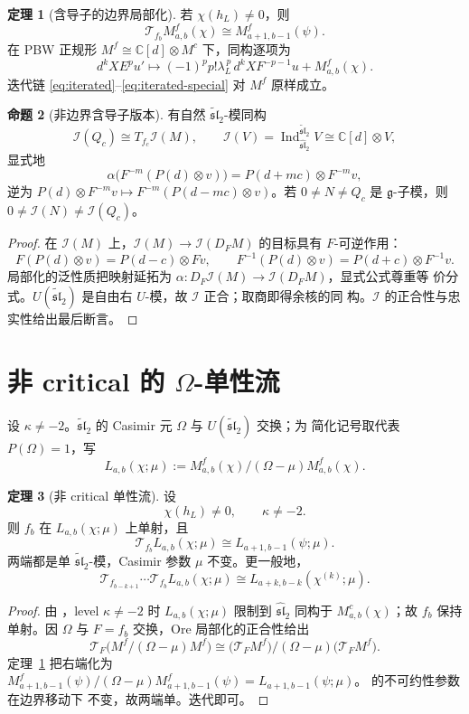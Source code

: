 \documentclass[UTF8,11pt]{ctexart}
\newcommand{\C}{\mathbb C}
\newcommand{\g}{\mathfrak g}
\newcommand{\slh}{\widehat{\mathfrak{sl}}_2}
\newcommand{\slt}{\widetilde{\mathfrak{sl}}_2}
\newcommand{\Ind}{\operatorname{Ind}}
\newcommand{\I}{\mathcal I}
\newcommand{\T}{\mathcal T}
\theoremstyle{definition}
\newtheorem{proposition}{命题}[section]
\newtheorem{theorem}[proposition]{定理}
\begin{document}
\begin{theorem}[含导子的边界局部化]\label{thm:boundary-f}
若 \(\chi(h_L)\ne0\)，则
\[
\boxed{\ \T_{f_b}M^f_{a,b}(\chi)\cong M^f_{a+1,b-1}(\psi).\ }
\]
在 PBW 正规形 \(M^f\cong\C[d]\otimes M^c\) 下，同构逐项为
\[
d^kXE^pu'\longmapsto
(-1)^pp!\lambda_L^{\,p}\,d^kXF^{-p-1}u+M^f_{a,b}(\chi).
\]
迭代链 \eqref{eq:iterated}--\eqref{eq:iterated-special} 对 \(M^f\) 原样成立。
\end{theorem}

\begin{proposition}[非边界含导子版本]\label{prop:d-nonb}
有自然 \(\slt\)-模同构
\[
\I(Q_c)\cong T_{f_c}\I(M),\qquad
\I(V)=\Ind_{\slh}^{\slt}V\cong\C[d]\otimes V,
\]
显式地
\[
\alpha\bigl(F^{-m}(P(d)\otimes v)\bigr)=P(d+mc)\otimes F^{-m}v,
\]
逆为 \(P(d)\otimes F^{-m}v\mapsto F^{-m}(P(d-mc)\otimes v)\)。若
\(0\ne N\ne Q_c\) 是 \(\g\)-子模，则 \(0\ne\I(N)\ne\I(Q_c)\)。
\end{proposition}

\begin{proof}
在 \(\I(M)\) 上，\(\I(M)\to\I(D_FM)\) 的目标具有 \(F\)-可逆作用：
\[
F(P(d)\otimes v)=P(d-c)\otimes Fv,\qquad
F^{-1}(P(d)\otimes v)=P(d+c)\otimes F^{-1}v.
\]
局部化的泛性质把映射延拓为 \(\alpha:D_F\I(M)\to\I(D_FM)\)，显式公式尊重等
价分式。\(U(\slt)\) 是自由右 \(U\)-模，故 \(\I\) 正合；取商即得余核的同
构。\(\I\) 的正合性与忠实性给出最后断言。
\end{proof}

\section{非 critical 的 \(\Omega\)-单性流}\label{sec:omega}

设 \(\kappa\ne-2\)。\(\slt\) 的 Casimir 元 \(\Omega\) 与 \(U(\slt)\) 交换；为
简化记号取代表 \(P(\Omega)=1\)，写
\[
L_{a,b}(\chi;\mu):=M^f_{a,b}(\chi)/(\Omega-\mu)M^f_{a,b}(\chi).
\]

\begin{theorem}[非 critical 单性流]\label{thm:omega-flow}
设
\[
\chi(h_L)\ne0,\qquad \kappa\ne-2.
\]
则 \(f_b\) 在 \(L_{a,b}(\chi;\mu)\) 上单射，且
\[
\boxed{\ \T_{f_b}L_{a,b}(\chi;\mu)\cong L_{a+1,b-1}(\psi;\mu).\ }
\]
两端都是单 \(\slt\)-模，Casimir 参数 \(\mu\) 不变。更一般地，
\[
\T_{f_{b-k+1}}\cdots\T_{f_b}L_{a,b}(\chi;\mu)
\cong L_{a+k,b-k}(\chi^{(k)};\mu).
\]
\end{theorem}

\begin{proof}
由 \cite[公式 (4.1)]{FGXZ}，level \(\kappa\ne-2\) 时 \(L_{a,b}(\chi;\mu)\)
限制到 \(\slh\) 同构于 \(M^c_{a,b}(\chi)\)；故 \(f_b\) 保持单射。因
\(\Omega\) 与 \(F=f_b\) 交换，Ore 局部化的正合性给出
\[
\T_F\bigl(M^f/(\Omega-\mu)M^f\bigr)
\cong
\bigl(\T_FM^f\bigr)/(\Omega-\mu)\bigl(\T_FM^f\bigr).
\]
定理~\ref{thm:boundary-f} 把右端化为
\(M^f_{a+1,b-1}(\psi)/(\Omega-\mu)M^f_{a+1,b-1}(\psi)
=L_{a+1,b-1}(\psi;\mu)\)。\cite[定理 4.1]{FGXZ} 的不可约性参数在边界移动下
不变，故两端单。迭代即可。
\end{proof}
\end{document}
